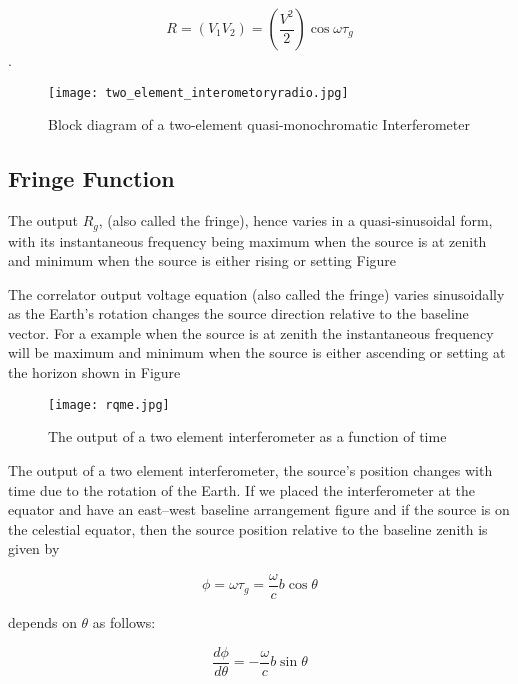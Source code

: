 {\begin{equation}
R=(V_1V_2)=\left(\frac{V^{2}}{2}\right)\cos{\omega\tau_g}\label{eq:6}
\end{equation}.

\begin{figure}[htp]
\centering
\texttt{[image: two\_element\_interometoryradio.jpg]}
 \caption{ Block diagram of a two-element quasi-monochromatic Interferometer} %
\label{fig:1}
\end{figure}


\subsection{Fringe Function}
The output \(R_g\), (also called
the fringe), hence varies in a quasi-sinusoidal form, with its instantaneous frequency
being maximum when the source is at zenith and minimum when the source is either
rising or setting Figure %

The correlator output voltage equation %
(also called the fringe) varies sinusoidally as the Earth’s rotation changes the source direction relative to the baseline vector. For a example when the source is at zenith the instantaneous frequency will be maximum and minimum when the  source is either ascending or setting at the horizon shown in Figure %

\begin{figure}[htp]
\centering
    \texttt{[image: rqme.jpg]}
\caption{The output of a two element interferometer as a function of time}
\label{fig:2}
\end{figure}

 The output of a two element interferometer, the source's position changes with time due to the rotation of the Earth. If we placed the interferometer at the equator and have an  east–west baseline arrangement  figure %
 and if the source is on the celestial equator, then the source position relative to the baseline zenith is given by

\begin{equation}
\phi =\omega\tau_g=\frac{\omega}{c}b\cos{\theta}\label{eq:7}
\end{equation}

depends on \(\theta\) as follows:

\begin{equation}
\frac{d\phi}{d\theta}=-\frac{\omega}{c}b\sin{\theta}\label{eq:8}
\end{equation}

}
